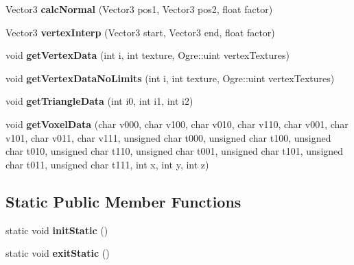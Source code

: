 \begin{DoxyCompactItemize}
\item 
\hypertarget{classVoxelBlockPersistent_ae6239990aaf7e0b365f7b8c4a57644e9}{
\-Vector3 {\bfseries calc\-Normal} (\-Vector3 pos1, \-Vector3 pos2, float factor)}
\label{dd/d36/classVoxelBlockPersistent_ae6239990aaf7e0b365f7b8c4a57644e9}

\item 
\hypertarget{classVoxelBlockPersistent_a68eb71eddbc79b296365b047d29d7ff3}{
\-Vector3 {\bfseries vertex\-Interp} (\-Vector3 start, \-Vector3 end, float factor)}
\label{dd/d36/classVoxelBlockPersistent_a68eb71eddbc79b296365b047d29d7ff3}

\item 
\hypertarget{classVoxelBlockPersistent_a46057aca5a6a1cb0b70246079a9128c0}{
void {\bfseries get\-Vertex\-Data} (int i, int texture, \-Ogre\-::uint vertex\-Textures)}
\label{dd/d36/classVoxelBlockPersistent_a46057aca5a6a1cb0b70246079a9128c0}

\item 
\hypertarget{classVoxelBlockPersistent_a3a9984b1c26b7f72d395d1aa81f59234}{
void {\bfseries get\-Vertex\-Data\-No\-Limits} (int i, int texture, \-Ogre\-::uint vertex\-Textures)}
\label{dd/d36/classVoxelBlockPersistent_a3a9984b1c26b7f72d395d1aa81f59234}

\item 
\hypertarget{classVoxelBlockPersistent_abf266da5d73bcbd31d6ad5aa136ad43d}{
void {\bfseries get\-Triangle\-Data} (int i0, int i1, int i2)}
\label{dd/d36/classVoxelBlockPersistent_abf266da5d73bcbd31d6ad5aa136ad43d}

\item 
\hypertarget{classVoxelBlockPersistent_adcf8c8ffab4099759c3f75bb3d4a6cdd}{
void {\bfseries get\-Voxel\-Data} (char v000, char v100, char v010, char v110, char v001, char v101, char v011, char v111, unsigned char t000, unsigned char t100, unsigned char t010, unsigned char t110, unsigned char t001, unsigned char t101, unsigned char t011, unsigned char t111, int x, int y, int z)}
\label{dd/d36/classVoxelBlockPersistent_adcf8c8ffab4099759c3f75bb3d4a6cdd}

\end{DoxyCompactItemize}
\subsection*{\-Static \-Public \-Member \-Functions}
\begin{DoxyCompactItemize}
\item 
\hypertarget{classVoxelBlockPersistent_a0ba875ea8aeb20280f51920ad73a83b6}{
static void {\bfseries init\-Static} ()}
\label{dd/d36/classVoxelBlockPersistent_a0ba875ea8aeb20280f51920ad73a83b6}

\item 
\hypertarget{classVoxelBlockPersistent_a3902dc7d545f56083316f249bcd74910}{
static void {\bfseries exit\-Static} ()}
\label{dd/d36/classVoxelBlockPersistent_a3902dc7d545f56083316f249bcd74910}

\end{DoxyCompactItemize}
